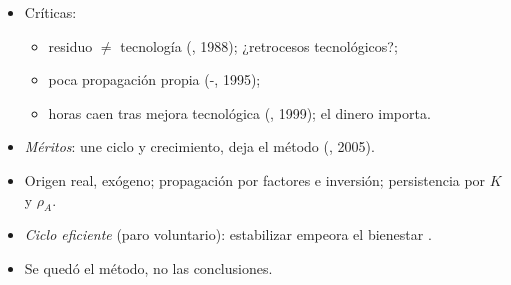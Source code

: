 \documentclass{article}
\begin{document}
\begin{columnas}
\begin{itemize}
\end{itemize}
\begin{itemize}
\item Críticas:
  \begin{itemize}
  \item residuo $\neq$ tecnología (, 1988); ¿retrocesos tecnológicos?;
  \item poca propagación propia (-, 1995);
  \item horas caen tras mejora tecnológica (, 1999); el dinero importa.
  \end{itemize}
\item \emph{Méritos}: une ciclo y crecimiento, deja el método (, 2005).
\end{itemize}
\begin{itemize}
\item Origen real, exógeno; propagación por factores e inversión; persistencia por $K$ y $\rho_A$.
\item \emph{Ciclo eficiente} (paro voluntario): estabilizar empeora el bienestar .
\item Se quedó el método, no las conclusiones.
\end{itemize}


\end{columnas}
\end{document}
